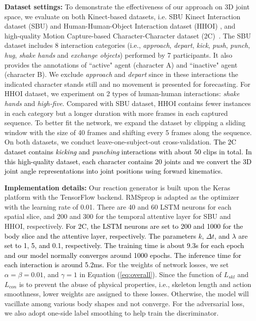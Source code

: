 \documentclass[times,twocolumn,final]{elsarticle}
\begin{document}
\textbf{Dataset settings:} To demonstrate the effectiveness of our approach on 3D joint space, we evaluate on both Kinect-based datasets, i.e. SBU Kinect Interaction dataset (SBU) \cite{yun2012two} and Human-Human-Object Interaction dataset (HHOI) \cite{shu2016learning}, and high-quality Motion Capture-based Character-Character dataset (2C)~\cite{shen2019interaction}. The SBU dataset includes 8 interaction categories (i.e., \emph{approach}, \emph{depart}, \emph{kick}, \emph{push}, \emph{punch}, \emph{hug}, \emph{shake hands} and \emph{exchange objects}) performed by 7 participants. It also provides the annotations of ``active" agent (character A) and ``inactive" agent (character B). %
We exclude \emph{approach} and \emph{depart} since in these interactions the indicated character stands still and no movement is presented for forecasting. For HHOI dataset, we experiment on 2 types of human-human interactions: \emph{shake hands} and \emph{high-five}. Compared with SBU dataset, HHOI contains fewer instances in each category but a longer duration with more frames in each captured sequence. To better fit the network, we expand the dataset by clipping a sliding window with the size of 40 frames and shifting every 5 frames along the sequence. On both datasets, we conduct leave-one-subject-out cross-validation. %
\textcolor{black}{The 2C dataset contains \emph{kicking} and \emph{punching} interactions with about 50 clips in total. In this high-quality dataset, each character contains 20 joints and we convert the 3D joint angle representations into joint positions using forward kinematics.}

\textbf{Implementation details:} Our reaction generator is built upon the Keras platform with the TensorFlow backend. RMSprop is adapted as the optimizer with the learning rate of 0.01. There are 40 and 60 LSTM neurons for each spatial slice, and 200 and 300 for the temporal attentive layer for SBU and HHOI, respectively. \textcolor{black}{For 2C, the LSTM neurons are set to 200 and 1000 for the body slice and the attentive layer, respectively. The parameters $k$, $\Delta t$, and $\lambda$ are set to 1, 5, and 0.1, respectively. The training time is about 9.3s for each epoch and our model normally converges around 1000 epochs. The inference time for each interaction is around 5.2ms.} For the weights of network losses, we set $\alpha=\beta=0.01$, and $\gamma=1$ in Equation (\ref{eq:overall}). Since the function of $L_{skl}$ and $L_{con}$ is to prevent the abuse of physical properties, i.e., skeleton length and action smoothness, lower weights are assigned to these losses. Otherwise, the model will vacillate among various body shapes and not converge. For the adversarial loss, we also adopt one-side label smoothing \cite{salimans2016improved} to help train the discriminator. 
\end{document}
